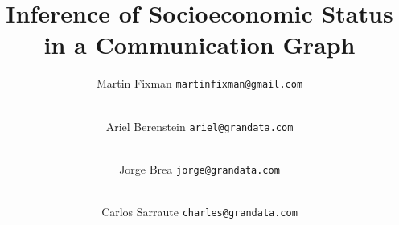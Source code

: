 



\title{Inference of Socioeconomic Status in a Communication Graph}



\author{
	Martin Fixman
	\texttt{martinfixman@gmail.com}
	\and \\
	Ariel Berenstein
	\texttt{ariel@grandata.com}
	\and \\
	Jorge Brea
	\texttt{jorge@grandata.com}
	\and \\
	Carlos Sarraute
	\texttt{charles@grandata.com}
}
\maketitle


\begin{abstract}
	
\end{abstract}




\newpage


{}


